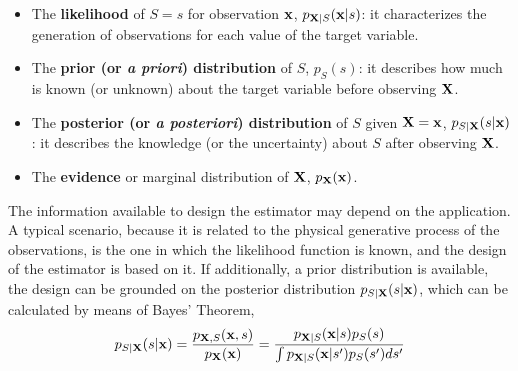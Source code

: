 \begin{itemize}
\item The {\bf likelihood} of $S=s$ for observation ${\bf x}$, $p_{{\bf X}|S}({\bf x}|s)$: it characterizes the generation of observations for each value of the target variable.
\item The {\bf prior (or \textit{a priori}) distribution}  of $S$, $p_S(s)$: it describes how much is known (or unknown) about the target variable before observing ${\bf X}$. 
\item The {\bf posterior (or \textit{a posteriori}) distribution} of $S$ given ${\bf X}={\bf x}$, $p_{S|{\bf X}}(s|{\bf x})$: it describes the knowledge (or the uncertainty) about $S$ after observing ${\bf X}$.
\item The {\bf evidence} or marginal distribution of ${\bf X}$, $p_{{\bf X}}({\bf x})$.
\end{itemize}


The information available to design the estimator may depend on the application. A typical scenario, because it is related to the physical generative process of the observations, is the one in which the likelihood function is known, and the design of the estimator is based on it. If additionally, a prior distribution is available, the design can be grounded on the posterior distribution $p_{S|{\bf X}}(s|{\bf x})$, which can be calculated by means of Bayes' Theorem,
\begin{equation}
p_{S|{\bf X}}(s|{\bf x}) 
	= \frac{p_{{\bf X},S}({\bf x},s)} {p_{\bf X}({\bf x})} 
	= \frac{p_{{\bf X}|S}({\bf x}|s) p_S(s)}
	       {\int p_{{\bf X}|S}({\bf x}|s') p_S(s') ds'}
\end{equation}


